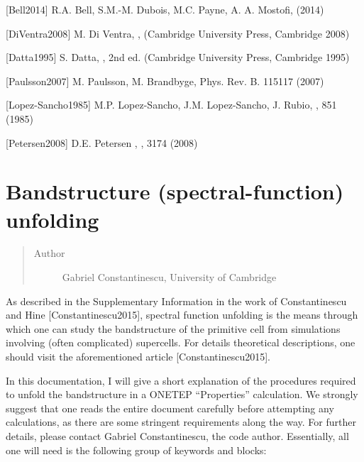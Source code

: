 \documentclass[letterpaper,10pt,english]{sphinxmanual}
\begin{document}
{[}Bell2014{]} R.A. Bell, S.M.-M. Dubois, M.C. Payne, A. A. Mostofi,  (2014)

{[}DiVentra2008{]} M. Di Ventra, , (Cambridge University Press, Cambridge 2008)

{[}Datta1995{]} S. Datta, , 2nd ed. (Cambridge University Press, Cambridge 1995)

{[}Paulsson2007{]} M. Paulsson, M. Brandbyge, Phys. Rev. B.  115117 (2007)

{[}Lopez-Sancho1985{]} M.P. Lopez-Sancho, J.M. Lopez-Sancho, J. Rubio,  , 851 (1985)

{[}Petersen2008{]} D.E. Petersen ,  , 3174 (2008)


\section{Bandstructure (spectral-function) unfolding}
\label{\detokenize{spectral_function_unfolding::doc}}\label{\detokenize{spectral_function_unfolding:bandstructure-spectral-function-unfolding}}\begin{quote}\begin{description}
\item[{Author}] \leavevmode
Gabriel Constantinescu, University of Cambridge

\end{description}\end{quote}

\begin{DUlineblock}{0em}
\item[] As described in the Supplementary Information in the work of
Constantinescu and Hine {[}Constantinescu2015{]},
spectral function unfolding is the means through which one can study
the bandstructure of the primitive cell from simulations involving
(often complicated) supercells. For details theoretical descriptions,
one should visit the aforementioned article
{[}Constantinescu2015{]}.
\item[] In this documentation, I will give a short explanation of the
procedures required to unfold the bandstructure in a ONETEP
“Properties” calculation. We strongly suggest that one reads the
entire document carefully before attempting any calculations, as there
are some stringent requirements along the way. For further details,
please contact Gabriel Constantinescu, the code author. Essentially,
all one will need is the following group of keywords and blocks:
\end{DUlineblock}
\end{document}
